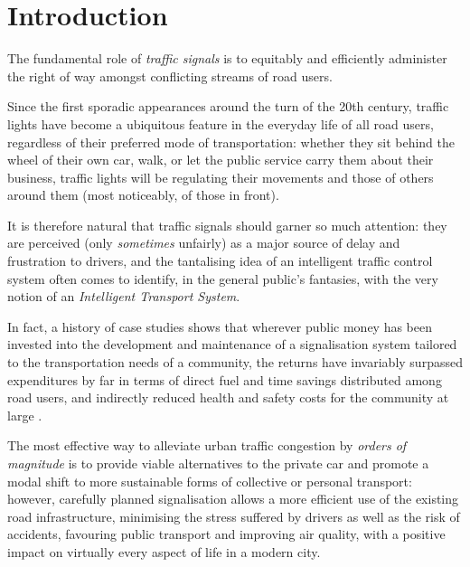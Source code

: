 \chapter*{Introduction}
The fundamental role of \emph{traffic signals} is to equitably and efficiently administer the right of way amongst conflicting streams of road users.

Since the first sporadic appearances around the turn of the 20th century, traffic lights have become a ubiquitous feature in the everyday life of all road users, regardless of their preferred mode of transportation: whether they sit behind the wheel of their own car, walk, or let the public service carry them about their business, traffic lights will be regulating their movements and those of others around them (most noticeably, of those in front).

It is therefore natural that traffic signals should garner so much attention: they are perceived (only \emph{sometimes} unfairly) as a major source of delay and frustration to drivers, and the tantalising idea of an intelligent traffic control system often comes to identify, in the general public's fantasies, with the very notion of an \emph{Intelligent Transport System}.

In fact, a history of case studies shows that wherever public money has been invested into the development and maintenance of a signalisation system tailored to the transportation needs of a community, the returns have invariably surpassed expenditures by far in terms of direct fuel and time savings distributed among road users, and indirectly reduced health and safety costs for the community at large \citep{koonce2008traffic}.

The most effective way to alleviate urban traffic congestion by \emph{orders of magnitude} is to provide viable alternatives to the private car and promote a modal shift to more sustainable forms of collective or personal transport: however, carefully planned signalisation allows a more efficient use of the existing road infrastructure,
minimising the stress suffered by drivers as well as the risk of accidents,
favouring public transport and improving air quality, with a positive impact on virtually every aspect of life in a modern city.

